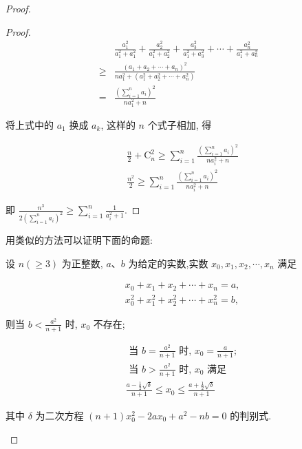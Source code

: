 \begin{proof}
\begin{example}
\begin{proof}
	$$
	\begin{aligned}
	& \frac{a_{1}^{2}}{a_{1}^{2}+a_{1}^{2}}+\frac{a_{2}^{2}}{a_{1}^{2}+a_{2}^{2}}+\frac{a_{3}^{2}}{a_{1}^{2}+a_{3}^{2}}+\cdots+\frac{a_{n}^{2}}{a_{1}^{2}+a_{n}^{2}} \\
	\geqslant & \frac{\left(a_{1}+a_{2}+\cdots+a_{n}\right)^{2}}{n a_{1}^{2}+\left(a_{1}^{2}+a_{2}^{2}+\cdots+a_{n}^{2}\right)} \\
	= & \frac{\left(\sum_{i=1}^{n} a_{i}\right)^{2}}{n a_{1}^{2}+n}
	\end{aligned}
	$$
	
	将上式中的 $a_{1}$ 换成 $a_{k}$, 这样的 $n$ 个式子相加, 得
	
	$$
	\begin{aligned}
	& \frac{n}{2}+\mathrm{C}_{n}^{2} \geqslant \sum_{i=1}^{n} \frac{\left(\sum_{i=1}^{n} a_{i}\right)^{2}}{n a_{i}^{2}+n} \\
	& \frac{n^{2}}{2} \geqslant \sum_{i=1}^{n} \frac{\left(\sum_{i=1}^{n} a_{i}\right)^{2}}{n a_{i}^{2}+n}
	\end{aligned}
	$$
	
	即 $\frac{n^{3}}{2\left(\sum_{i=1}^{n} a_{i}\right)^{2}} \geqslant \sum_{i=1}^{n} \frac{1}{a_{i}^{2}+1}$.
\end{proof}
\begin{note}
	用类似的方法可以证明下面的命题:
	
	设 $n(\geqslant 3)$ 为正整数, $a 、 b$ 为给定的实数,实数 $x_{0}, x_{1}, x_{2}, \cdots, x_{n}$ 满足
	
	$$
	\begin{aligned}
	& x_{0}+x_{1}+x_{2}+\cdots+x_{n}=a, \\
	& x_{0}^{2}+x_{1}^{2}+x_{2}^{2}+\cdots+x_{n}^{2}=b,
	\end{aligned}
	$$
	
	则当 $b<\frac{a^{2}}{n+1}$ 时, $x_{0}$ 不存在;
	
	$$
	\begin{aligned}
	& \text { 当 } b=\frac{a^{2}}{n+1} \text { 时, } x_{0}=\frac{a}{n+1} \text {; } \\
	& \text { 当 } b>\frac{a^{2}}{n+1} \text { 时, } x_{0} \text { 满足 } \\
	& \frac{a-\frac{1}{2} \sqrt{\delta}}{n+1} \leqslant x_{0} \leqslant \frac{a+\frac{1}{2} \sqrt{\delta}}{n+1}
	\end{aligned}
	$$
	
	其中 $\delta$ 为二次方程 $(n+1) x_{0}^{2}-2 a x_{0}+a^{2}-n b=0$ 的判别式.
\end{note}


\end{example}
\end{proof}
